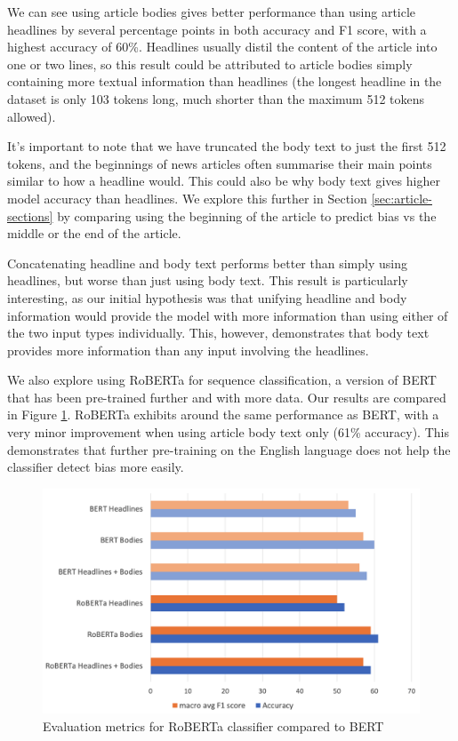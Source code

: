We can see using article bodies gives better performance than using article headlines by several percentage points in both accuracy and F1 score, with a highest accuracy of 60\%. Headlines usually distil the content of the article into one or two lines, so this result could be attributed to article bodies simply containing more textual information than headlines (the longest headline in the dataset is only 103 tokens long, much shorter than the maximum 512 tokens allowed).

It's important to note that we have truncated the body text to just the first 512 tokens, and the beginnings of news articles often summarise their main points similar to how a headline would. This could also be why body text gives higher model accuracy than headlines. We explore this further in Section \ref{sec:article-sections} by comparing using the beginning of the article to predict bias vs the middle or the end of the article.

Concatenating headline and body text performs better than simply using headlines, but worse than just using body text. This result is particularly interesting, as our initial hypothesis was that unifying headline and body information would provide the model with more information than using either of the two input types individually. This, however, demonstrates that body text provides more information than any input involving the headlines.

We also explore using RoBERTa for sequence classification, a version of BERT that has been pre-trained further and with more data. Our results are compared in Figure \ref{fig:nmr-roberta-accuracy-f1}. RoBERTa exhibits around the same performance as BERT, with a very minor improvement when using article body text only (61\% accuracy). This demonstrates that further pre-training on the English language does not help the classifier detect bias more easily. 

\begin{figure}
    \centering
    \includegraphics[scale=0.35]{0-img/nmr-roberta-accuracy-f1.png}
    \caption{Evaluation metrics for RoBERTa classifier compared to BERT}
    \label{fig:nmr-roberta-accuracy-f1}
\end{figure}

